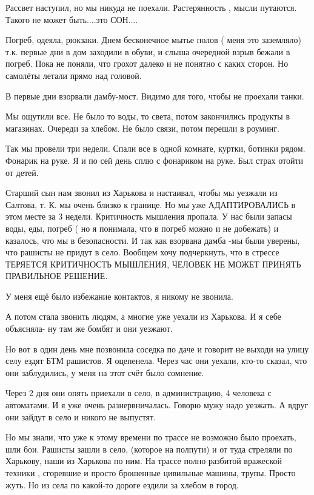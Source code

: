 Рассвет наступил, но мы никуда не поехали. Растерянность , мысли путаются.
Такого не может быть....это СОН....

Погреб, одеяла, рюкзаки. Днем бесконечное мытье полов ( меня это заземляло)
т.к. первые дни в дом заходили в обуви, и слыша очередной взрыв бежали в
погреб. Пока не поняли, что грохот далеко и не понятно с каких сторон. Но
самолёты летали прямо над головой. 

В первые дни взорвали дамбу-мост. Видимо для того, чтобы не проехали танки. 

 Мы ощутили все. Не было то воды, то света, потом закончились продукты в
 магазинах. Очереди за хлебом. Не было связи, потом перешли в роуминг.

Так мы провели три недели. Спали все в одной комнате, куртки, ботинки рядом.
Фонарик на руке. Я и по сей день сплю с фонариком на руке. Был страх отойти от
детей.

Старший сын нам звонил из Харькова и настаивал, чтобы мы уезжали из Салтова, т.
К.  мы очень близко к границе.  Но мы уже АДАПТИРОВАЛИСЬ в этом месте за 3
недели. Критичность мышления пропала. У нас были запасы воды, еды, погреб ( но
я понимала, что в погреб можно и не добежать) и казалось, что мы в
безопасности. И так как взорвана дамба -мы были уверены, что рашисты не придут
в село.  Вообщем хочу подчеркнуть, что в стрессе ТЕРЯЕТСЯ КРИТИЧНОСТЬ МЫШЛЕНИЯ,
ЧЕЛОВЕК НЕ МОЖЕТ ПРИНЯТЬ ПРАВИЛЬНОЕ РЕШЕНИЕ.

У меня ещё было избежание контактов, я никому не звонила.

А потом стала звонить людям, а многие уже уехали из Харькова. И я себе
объясняла- ну там же бомбят и они уезжают.

Но вот в один день мне позвонила соседка по даче и говорит не выходи на улицу
селу ездят БТМ рашистов. Я оцепенела. Через час они уехали, кто-то сказал, что
они заблудились, у меня на этот счёт было сомнение. 

Через 2 дня  они опять приехали  в село, в администрацию,  4 человека с
автоматами. И я уже очень разнервничалась. Говорю мужу надо уезжать. А вдруг
они зайдут в село и никого не выпустят.

Но мы знали, что уже к этому времени по трассе не возможно было проехать, шли
бои. Рашисты зашли в село, (которое на полпути) и от туда стреляли по Харькову,
наши из Харькова по ним. На трассе полно разбитой вражеской техники , сгоревшие
и просто брошенные цивильные машины, трупы. Просто жуть. Но из села по какой-то
дороге  ездили за хлебом в город.

